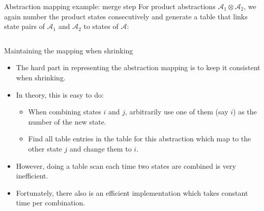 \documentclass{gkibeamer}
\begin{document}
\begin{frame}{Abstraction mapping example: merge step}
  For product abstractions $\mathcal A_1 \otimes \mathcal A_2$, we
  again number the product states consecutively and generate a table
  that links state pairs of $\mathcal A_1$ and $\mathcal A_2$ to
  states of $\mathcal A$:

  \begin{columns}
    \begin{column}{7.2cm}
      \renewcommand{\bendtransition}{\bendtransitionnolabel}%
    \end{column}
    \begin{column}{4.0cm}
    \end{column}
  \end{columns}
\end{frame}

\begin{frame}{Maintaining the mapping when shrinking}
  \begin{itemize}
  \item The hard part in representing the abstraction mapping is to
    keep it consistent when shrinking.
  \item In theory, this is easy to do:
    \begin{itemize}
    \item When combining states $i$ and $j$, arbitrarily use one of
      them (say $i$) as the number of the new state.
    \item Find all table entries in the table for this abstraction
      which map to the other state $j$ and change them to $i$.
    \end{itemize}
  \item However, doing a table scan each time two states are combined
    is very inefficient.
  \item Fortunately, there also is an efficient implementation which
    takes constant time per combination.
  \end{itemize}
\end{frame}
\end{document}
